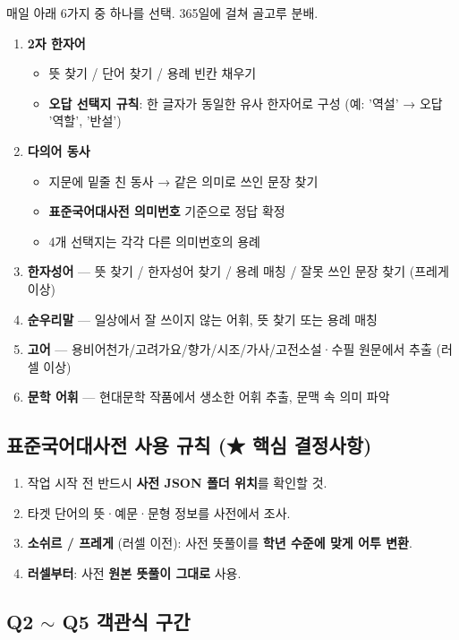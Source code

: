 \documentclass[11pt,a4paper]{article}
\begin{document}
매일 아래 6가지 중 하나를 선택. 365일에 걸쳐 골고루 분배.

\begin{enumerate}
  \item \textbf{2자 한자어}
    \begin{itemize}
      \item 뜻 찾기 / 단어 찾기 / 용례 빈칸 채우기
      \item \textbf{오답 선택지 규칙}: 한 글자가 동일한 유사 한자어로 구성 (예: '역설' → 오답 '역할', '반설')
    \end{itemize}
  \item \textbf{다의어 동사}
    \begin{itemize}
      \item 지문에 밑줄 친 동사 → 같은 의미로 쓰인 문장 찾기
      \item \textbf{표준국어대사전 의미번호} 기준으로 정답 확정
      \item 4개 선택지는 각각 다른 의미번호의 용례
    \end{itemize}
  \item \textbf{한자성어} — 뜻 찾기 / 한자성어 찾기 / 용례 매칭 / 잘못 쓰인 문장 찾기 (프레게 이상)
  \item \textbf{순우리말} — 일상에서 잘 쓰이지 않는 어휘, 뜻 찾기 또는 용례 매칭
  \item \textbf{고어} — 용비어천가/고려가요/향가/시조/가사/고전소설·수필 원문에서 추출 (러셀 이상)
  \item \textbf{문학 어휘} — 현대문학 작품에서 생소한 어휘 추출, 문맥 속 의미 파악
\end{enumerate}

\subsection{표준국어대사전 사용 규칙 (★ 핵심 결정사항)}

\begin{enumerate}
  \item 작업 시작 전 반드시 \textbf{사전 JSON 폴더 위치}를 확인할 것.
  \item 타겟 단어의 뜻·예문·문형 정보를 사전에서 조사.
  \item \textbf{소쉬르 / 프레게} (러셀 이전): 사전 뜻풀이를 \textbf{학년 수준에 맞게 어투 변환}.
  \item \textbf{러셀부터}: 사전 \textbf{원본 뜻풀이 그대로} 사용.
\end{enumerate}

\subsection{Q2 $\sim$ Q5 객관식 구간}
\end{document}

